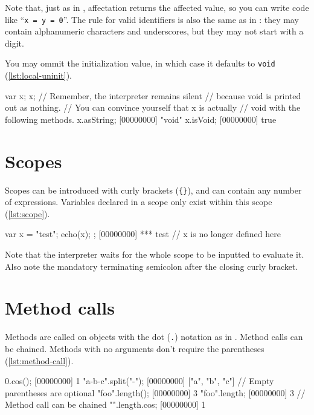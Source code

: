 Note that, just as in \Cxx, affectation returns the affected value, so
you can write code like ``\lstinline|x = y = 0|''. The rule for valid
identifiers is also the same as in \Cxx: they may contain alphanumeric
characters and underscores, but they may not start with a digit.

You may ommit the initialization value, in which case it defaults to
\lstinline|void| (\autoref{lst:local-uninit}).

\begin{urbiscript}[caption=Variables initialization defaults to
  nil,label=lst:local-uninit]
var x;
x;
// Remember, the interpreter remains silent
// because void is printed out as nothing.
// You can convince yourself that x is actually
// void with the following methods.
x.asString;
[00000000] "void"
x.isVoid;
[00000000] true
\end{urbiscript}

\section{Scopes}

Scopes can be introduced with curly brackets (\texttt{\{\}}), and can
contain any number of expressions. Variables declared in a scope only
exist within this scope (\autoref{lst:scope}).

\begin{urbiscript}[caption=Scoping a variable,label=lst:scope]
{
  var x = "test";
  echo(x);
};
[00000000] *** test
// x is no longer defined here
\end{urbiscript}

Note that the interpreter waits for the whole scope to be inputted to
evaluate it. Also note the mandatory terminating semicolon after the
closing curly bracket.

\section{Method calls}

Methods are called on objects with the dot (\texttt{.}) notation as in
\Cxx. Method calls can be chained. Methods with no arguments don't
require the parentheses (\autoref{lst:method-call}).

\begin{urbiscript}[caption=Calling methods,label=lst:method-call]
0.cos();
[00000000] 1
"a-b-c".split("-");
[00000000] ["a", "b", "c"]
// Empty parentheses are optional
"foo".length();
[00000000] 3
"foo".length;
[00000000] 3
// Method call can be chained
"".length.cos;
[00000000] 1
\end{urbiscript}

